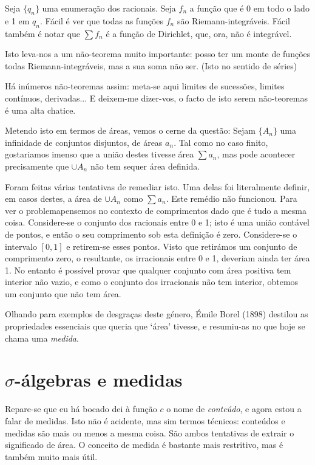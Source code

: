 \documentclass{article}
\begin{document}
Seja $\{q_n\}$ uma enumeração dos racionais. Seja $f_n$ a função que é 0 em todo o lado e 1 em $q_n$. Fácil é ver que todas as funções $f_n$ são Riemann-integráveis. Fácil também é notar que $\sum f_n$ é a função de Dirichlet, que, ora, não é integrável.

Isto leva-nos a um não-teorema muito importante: posso ter um monte de funções todas Riemann-integráveis, mas a sua soma não ser. (Isto no sentido de séries)

Há inúmeros não-teoremas assim: meta-se aqui limites de sucessões, limites contínuos, derivadas... E deixem-me dizer-vos, o facto de isto serem não-teoremas é uma alta chatice.

Metendo isto em termos de áreas, vemos o cerne da questão: Sejam $\{A_n\}$ uma infinidade de conjuntos disjuntos, de áreas $a_n$. Tal como no caso finito, gostariamos imenso que a união destes tivesse área $\sum a_n$, mas pode acontecer precisamente que $\cup A_n$ não tem sequer área definida.

Foram feitas várias tentativas de remediar isto. Uma delas foi literalmente definir, em casos destes, a área de $\cup A_n$ como $\sum a_n$. Este remédio não funcionou. Para ver o problemapensemos no contexto de comprimentos dado que é tudo a mesma coisa. Considere-se o conjunto dos racionais entre 0 e 1; isto é uma união contável de pontos, e então o seu comprimento sob esta definição é zero. Considere-se o intervalo $[0,1]$ e retirem-se esses pontos. Visto que retirámos um conjunto de comprimento zero, o resultante, os irracionais entre 0 e 1, deveriam ainda ter área 1. No entanto é possível provar que qualquer conjunto com área positiva tem interior não vazio, e como o conjunto dos irracionais não tem interior, obtemos um conjunto que não tem área.

Olhando para exemplos de desgraças deste género, Émile Borel (1898) destilou as propriedades essenciais que queria que `área' tivesse, e resumiu-as no que hoje se chama uma \emph{medida}.

\section{$\sigma$-álgebras e medidas}

Repare-se que eu há bocado dei à função $c$ o nome de \emph{conteúdo}, e agora estou a falar de medidas. Isto não é acidente, mas sim termos técnicos: conteúdos e medidas são mais ou menos a mesma coisa. São ambos tentativas de extrair o significado de área. O conceito de medida é bastante mais restritivo, mas é também muito mais útil.
\end{document}
